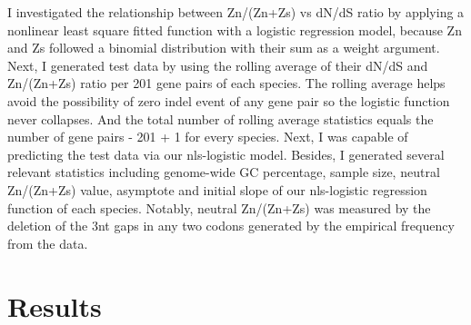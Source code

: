 \indent I investigated the relationship between Zn/(Zn+Zs) vs dN/dS ratio by applying a nonlinear least square fitted function with a logistic regression model, because Zn and Zs followed a binomial distribution with their sum as a weight argument. Next, I generated test data by using the rolling average of their dN/dS and Zn/(Zn+Zs) ratio per 201 gene pairs of each species. The rolling average helps avoid the possibility of zero indel event of any gene pair so the logistic function never collapses. And the total number of rolling average statistics equals the number of gene pairs - 201 + 1 for every species. Next, I was capable of predicting the test data via our nls-logistic model. Besides, I generated several relevant statistics including genome-wide GC percentage, sample size, neutral Zn/(Zn+Zs) value, asymptote and initial slope of our nls-logistic regression function of each species. Notably, neutral Zn/(Zn+Zs) was measured by the deletion of the 3nt gaps in any two codons generated by the empirical frequency from the data. 


\section{Results}
